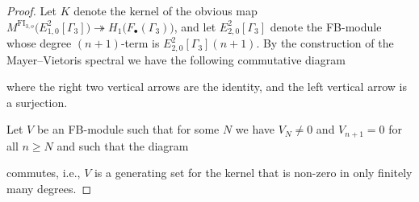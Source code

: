 \documentclass[pagebackref,colorlinks,citecolor=blue,linkcolor=blue,urlcolor=blue,filecolor=blue]{article}
\theoremstyle{definition}\newtheorem{definition}[thm]{Definition}
\theoremstyle{definition}
\begin{document}
\begin{proof}

Let $K$ denote the kernel of the obvious map $M^{\text{FI}_{3,o}}\big(E^{2}_{1,0}[\Gamma_{3}]\big)\twoheadrightarrow H_{1}\big(F_{\bullet}(\Gamma_{3})\big)$, and let $E^{2}_{2,0}[\Gamma_{3}]$ denote the FB-module whose degree $(n+1)$-term is $E^{2}_{2,0}[\Gamma_{3}](n+1)$.
By the construction of the Mayer--Vietoris spectral  we have the following commutative diagram

\begin{center}
\end{center}
where the right two vertical arrows are the identity, and the left vertical arrow is a surjection.

Let $V$ be an FB-module such that for some $N$ we have $V_{N}\neq 0$ and $V_{n+1}=0$ for all $n\ge N$ and such that the diagram

\begin{center}
\end{center}
commutes, i.e., $V$ is a generating set for the kernel that is non-zero in only finitely many degrees.


\end{proof}
\end{document}
